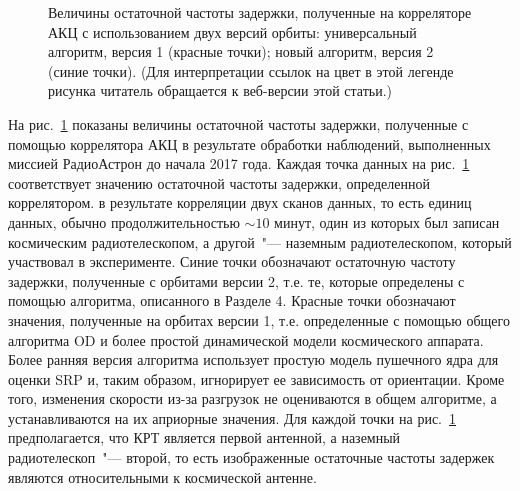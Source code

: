 \begin{figure}[tbh]
 \caption{Величины остаточной частоты задержки, полученные на корреляторе АКЦ с
использованием двух версий орбиты: универсальный алгоритм, версия 1 (красные точки); новый алгоритм,
версия 2 (синие точки). (Для интерпретации ссылок на цвет в этой легенде рисунка читатель обращается
к веб-версии этой статьи.)}
 \label{fig:rates_v1v2}
\end{figure}

На рис.~\ref{fig:rates_v1v2} показаны величины остаточной частоты задержки, полученные с помощью
коррелятора АКЦ в результате обработки наблюдений, выполненных миссией РадиоАстрон до начала 2017
года. Каждая точка данных на рис.~\ref{fig:rates_v1v2} соответствует значению остаточной частоты
задержки, определенной коррелятором. в результате корреляции двух сканов данных, то есть единиц
данных, обычно продолжительностью $\sim10$ минут, один из которых был записан космическим
радиотелескопом, а другой~"--- наземным радиотелескопом, который участвовал в эксперименте. Синие
точки обозначают остаточную частоту задержки, полученные с орбитами версии 2, т.е. те, которые
определены с помощью алгоритма, описанного в Разделе 4. Красные точки обозначают значения,
полученные на орбитах версии 1, т.е. определенные с помощью общего алгоритма OD и более простой
динамической модели космического аппарата. Более ранняя версия алгоритма использует простую модель
пушечного ядра для оценки SRP и, таким образом, игнорирует ее зависимость от ориентации. Кроме того,
изменения скорости из-за разгрузок не оцениваются в общем алгоритме, а устанавливаются на их
априорные значения. Для каждой точки на рис.~\ref{fig:rates_v1v2} предполагается, что КРТ является
первой антенной, а наземный радиотелескоп~"--- второй, то есть изображенные остаточные частоты
задержек являются относительными к космической антенне.

